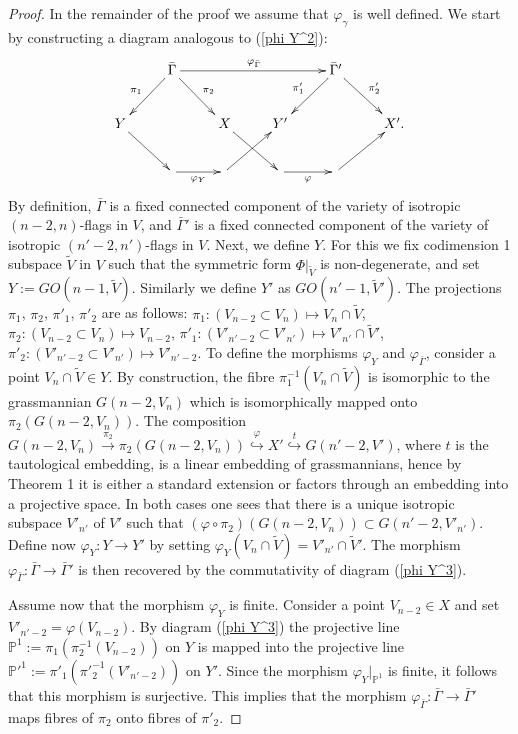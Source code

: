 \documentclass[12pt]{amsart}
\renewcommand{\phi}{\varphi}
\theoremstyle{definition}
\begin{document}
\begin{proof}
In the remainder of the proof we assume that $\phi_{\gamma}$ is well defined. We start by constructing a diagram
analogous to (\ref{phi Y^2}):
\begin{equation}\label{phi Y^3}
\xymatrix{
& \bar{\Gamma}\ar[rrr]^{\phi_{\bar{\Gamma}}}\ar[dl]_{\pi_1}\ar[dr]^{\pi_2} &&&
\bar{\Gamma}'\ar[dl]_{\pi'_1}\ar[dr]^{\pi'_2}& \\
Y\ar[dr]&& X\ar[dr]& Y' && X'.\\
&\ar[r]_{\phi_Y}&\ar[ur]&\ar[r]_{\phi}&\ar[ur]& }
\end{equation}
By definition, $\bar{\Gamma}$ is a fixed connected component of the variety of isotropic $(n-2,n)$-flags in $V$, and
$\bar{\Gamma}'$ is a fixed connected component of the variety of isotropic $(n'-2,n')$-flags in $V$. Next, we define
$Y$. For this we fix codimension 1 subspace $\tilde{V}$ in $V$ such that the symmetric form $\Phi|_{\tilde{V}}$ is
non-degenerate, and set $Y:=GO(n-1,\tilde{V})$. Similarly we define $Y'$ as $GO(n'-1,\tilde{V}')$. The projections
$\pi_1$, $\pi_2$, $\pi'_1$, $\pi'_2$ are as follows:
$\pi_1:(V_{n-2}\subset V_n)\mapsto V_n\cap\tilde{V}$, $\pi_2:(V_{n-2}\subset V_n)\mapsto V_{n-2}$,
$\pi'_1:(V'_{n'-2}\subset V'_{n'})\mapsto V'_{n'}\cap\tilde{V}'$, $\pi'_2:(V'_{n'-2}\subset V'_{n'})\mapsto V'_{n'-2}$.
To define the morphisms  $\phi_Y$ and $\phi_{\bar{\Gamma}}$, consider
a point $V_n\cap\tilde{V}\in Y$. By construction, the fibre $\pi_1^{-1}(V_n\cap\tilde{V})$ is isomorphic to the
grassmannian $G(n-2,V_n)$ which is isomorphically mapped onto $\pi_2(G(n-2,V_n))$. The composition
$G(n-2,V_n)\overset{\pi_2}\to \pi_2(G(n-2,V_n))\overset{\phi}\hookrightarrow X'
\overset{t} \hookrightarrow G(n'-2,V')$, where $t$ is the tautological embedding, is a linear embedding of
grassmannians, hence by Theorem 1 it is either a standard extension or factors through an embedding into a projective
space. In both cases one sees that there is a unique isotropic subspace $V'_{n'}$ of $V'$ such that
$(\phi\circ\pi_2)(G(n-2,V_n))\subset G(n'-2,V'_{n'})$. Define now $\phi_Y:Y\to Y'$ by setting
$\phi_Y(V_n\cap\tilde{V})=V'_{n'}\cap\tilde{V}'$. The morphism $\phi_{\bar{\Gamma}}:\bar{\Gamma}\to\bar{\Gamma}'$ is
then recovered by the commutativity of diagram (\ref{phi Y^3}).

Assume now that the morphism $\phi_Y$ is finite. Consider a point $V_{n-2}\in X$ and set $V'_{n'-2}=\phi(V_{n-2})$.
By diagram (\ref{phi Y^3}) the projective line $\mathbb{P}^1:=\pi_1(\pi_2^{-1}(V_{n-2}))$ on $Y$ is mapped into the
projective line $\mathbb{P}'^1:=\pi'_1({\pi'}_2^{-1}(V'_{n'-2}))$ on $Y'$. Since the morphism $\phi_Y|_{\mathbb{P}^1}$
is finite, it follows that this morphism is surjective. This implies that the morphism
$\phi_{\bar{\Gamma}}:\bar{\Gamma}\to\bar{\Gamma}'$ maps fibres of  $\pi_2$ onto fibres of $\pi'_2$.


\end{proof}
\end{document}
